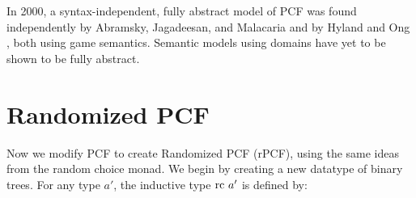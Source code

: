 In 2000, a syntax-independent, fully abstract model of PCF was found independently by Abramsky, Jagadeesan, and Malacaria \cite{abramsky2000full} and by Hyland and Ong \cite{hyland2000full}, both using game semantics.  Semantic models using domains have yet to be shown to be fully abstract.

\section{Randomized PCF}

\begin{table}
\begin{center}
\caption{Typing Rules For rPCF} \label{rpcftypes}
\end{center}
\end{table}

Now we modify PCF to create Randomized PCF (rPCF), using the same ideas from the random choice monad.  We begin by creating a new datatype of binary trees.  For any type $a'$, the inductive type $\textrm{rc } a'$ is defined by:

